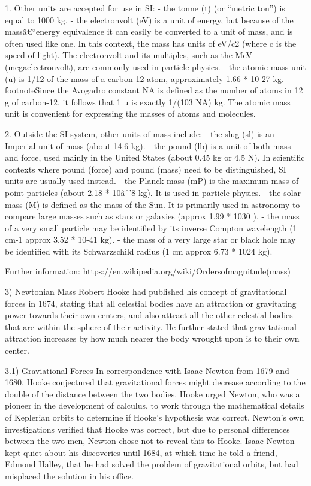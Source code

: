 \documentclass{book}
\begin{document}
        1. Other units are accepted for use in SI:
            - the tonne (t) (or ``metric ton'') is equal to 1000 kg.
            - the electronvolt (eV) is a unit of energy, but because of the massâ€“energy equivalence it can easily be converted to a unit of mass, and is often used like one. In this context, the mass has units of eV/c2 (where c is the speed of light). The electronvolt and its multiples, such as the MeV (megaelectronvolt), are commonly used in particle physics.
            - the atomic mass unit (u) is 1/12 of the mass of a carbon-12 atom, approximately 1.66 * 10{-27} kg. footnote{Since the Avogadro constant NA is defined as the number of atoms in 12 g of carbon-12, it follows that 1 u is exactly 1/(103 NA) kg.} The atomic mass unit is convenient for expressing the masses of atoms and molecules.        
        
        2. Outside the SI system, other units of mass include:
            - the slug (sl) is an Imperial unit of mass (about 14.6 kg).
            - the pound (lb) is a unit of both mass and force, used mainly in the United States (about 0.45 kg or 4.5 N). In scientific contexts where pound (force) and pound (mass) need to be distinguished, SI units are usually used instead.
            - the Planck mass (mP) is the maximum mass of point particles (about 2.18 * 10{âˆ’8} kg). It is used in particle physics.
            - the solar mass (M) is defined as the mass of the Sun. It is primarily used in astronomy to compare large masses such as stars or galaxies (approx 1.99 * 10{30} ).
            - the mass of a very small particle may be identified by its inverse Compton wavelength (1 cm{-1} approx 3.52 * 10{-41} kg).
            - the mass of a very large star or black hole may be identified with its Schwarzschild radius (1 cm approx 6.73 * 10{24} kg).
            
        Further information: https://en.wikipedia.org/wiki/Ordersofmagnitude(mass)
    
    3) Newtonian Mass
    Robert Hooke had published his concept of gravitational forces in 1674, stating that all celestial bodies have an attraction or gravitating power towards their own centers, and also attract all the other celestial bodies that are within the sphere of their activity. He further stated that gravitational attraction increases by how much nearer the body wrought upon is to their own center.
    
    3.1) Graviational Forces
    In correspondence with Isaac Newton from 1679 and 1680, Hooke conjectured that gravitational forces might decrease according to the double of the distance between the two bodies. Hooke urged Newton, who was a pioneer in the development of calculus, to work through the mathematical details of Keplerian orbits to determine if Hooke's hypothesis was correct. Newton's own investigations verified that Hooke was correct, but due to personal differences between the two men, Newton chose not to reveal this to Hooke. Isaac Newton kept quiet about his discoveries until 1684, at which time he told a friend, Edmond Halley, that he had solved the problem of gravitational orbits, but had misplaced the solution in his office.
    
\end{document}
